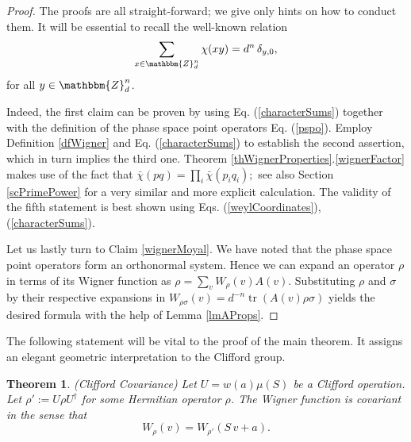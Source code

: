 \documentclass[aps,twocolumn,floatfix]{revtex4}
\newtheorem{theorem}{Theorem}
\def\ZZ{\mathbbm{Z}}
\DeclareMathOperator{\tr}{tr}
\begin{document}
\begin{proof}
	The proofs are all straight-forward; we give only hints on how to
	conduct them. It will be essential to recall  the well-known
	relation
	\begin{equation}\label{characterSums}
		\sum_{x\in \ZZ_d^n} \chi(x y)= d^n\,\delta_{y,0},
	\end{equation}
	for all $y \in \ZZ_d^n$.

	Indeed, the first claim can be proven by using Eq.
	(\ref{characterSums}) together with the definition of the
	phase space point operators Eq. (\ref{pspo}). Employ Definition
	\ref{dfWigner} and Eq. (\ref{characterSums}) to establish the second
	assertion, which in turn implies the third one. Theorem
	\ref{thWignerProperties}.\ref{wignerFactor} makes use of the fact
	that 
	$
		\bar\chi(p q)=\prod_i \bar\chi(p_i q_i);
	$
	see also Section \ref{scPrimePower} for a very similar and more
	explicit calculation. The validity of the fifth statement is best
	shown using Eqs. (\ref{weylCoordinates}), (\ref{characterSums}).
	
	Let us lastly turn to Claim \ref{wignerMoyal}.  We have noted that
	the phase space point operators form an orthonormal system. Hence we
	can expand an operator $\rho$ in terms of its Wigner function as
	$\rho = \sum_v W_\rho(v) A(v)$. Substituting $\rho$ and $\sigma$ by
	their respective expansions in
	$W_{\rho \sigma}(v) = d^{-n} \tr(A(v) \rho \sigma)$ yields the
	desired formula with the help of Lemma \ref{lmAProps}.
\end{proof}

The following statement will be vital to the proof of the main
theorem. It assigns an elegant geometric interpretation to the
Clifford group.

\begin{theorem}\label{thWignerCovariance}
	\emph{(Clifford Covariance)}
	Let $U=w(a)\mu(S)$ be a Clifford operation. Let $\rho':=U\rho
	U^\dagger$ for some Hermitian operator $\rho$. The Wigner function
	is \emph{covariant} in the sense that
	\begin{equation*}
		W_{\rho}(v) = W_{\rho'}(S\,v+a).
	\end{equation*}
\end{theorem}
\end{document}
